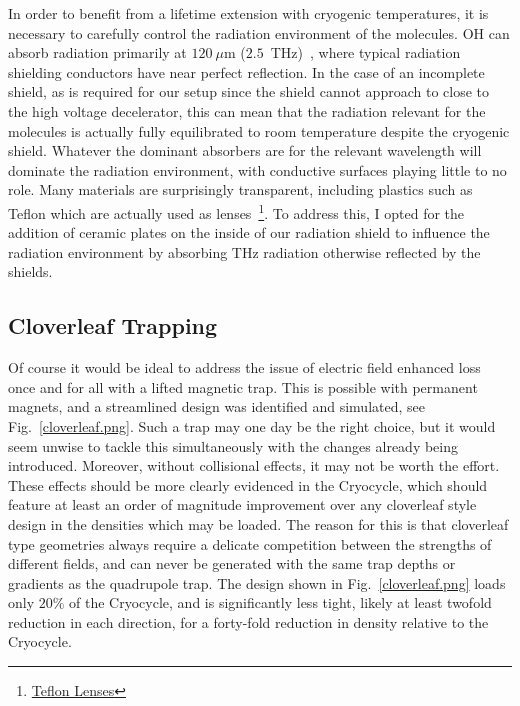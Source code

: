 In order to benefit from a lifetime extension with cryogenic temperatures, it is necessary to carefully control the radiation environment of the molecules. OH can absorb radiation primarily at $120~\mu$m ($2.5$~THz)~\cite{Hoekstra2007}, where typical radiation shielding conductors have near perfect reflection.
In the case of an incomplete shield, as is required for our setup since the shield cannot approach to close to the high voltage decelerator, this can mean that the radiation relevant for the molecules is actually fully equilibrated to room temperature despite the cryogenic shield.
Whatever the dominant absorbers are for the relevant wavelength will dominate the radiation environment, with conductive surfaces playing little to no role.
Many materials are surprisingly transparent, including plastics such as Teflon which are actually used as lenses~\footnote{\href{https://www.thorlabs.com/newgrouppage9.cfm?objectgroup_id=1627}{Teflon Lenses}}.
To address this, I opted for the addition of ceramic plates on the inside of our radiation shield to influence the radiation environment by absorbing THz radiation otherwise reflected by the shields.

\subsection{Cloverleaf Trapping}

Of course it would be ideal to address the issue of electric field enhanced loss once and for all with a lifted magnetic trap.
This is possible with permanent magnets, and a streamlined design was identified and simulated, see Fig.~\ref{cloverleaf.png}.
Such a trap may one day be the right choice, but it would seem unwise to tackle this simultaneously with the changes already being introduced.
Moreover, without collisional effects, it may not be worth the effort.
These effects should be more clearly evidenced in the Cryocycle, which should feature at least an order of magnitude improvement over any cloverleaf style design in the densities which may be loaded.
The reason for this is that cloverleaf type geometries always require a delicate competition between the strengths of different fields, and can never be generated with the same trap depths or gradients as the quadrupole trap.
The design shown in Fig.~\ref{cloverleaf.png} loads only $20\%$ of the Cryocycle, and is significantly less tight, likely at least twofold reduction in each direction, for a forty-fold reduction in density relative to the Cryocycle.

